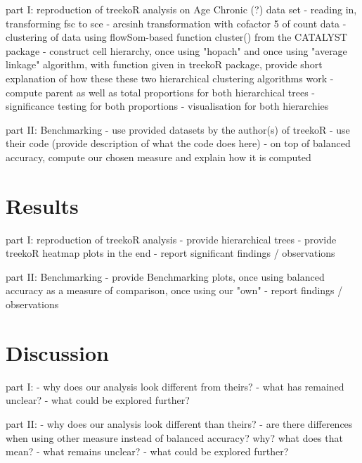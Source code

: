 \documentclass[11pt,a4paper,twoside]{report}\usepackage[]{graphicx}\usepackage[]{color}
\begin{document}
part I: reproduction of treekoR analysis on Age Chronic (?) data set
- reading in, transforming fsc to sce
- arcsinh transformation with cofactor 5 of count data
- clustering of data using flowSom-based function cluster() from the CATALYST package
- construct cell hierarchy, once using "hopach" and once using "average linkage" algorithm, with function given in treekoR package, provide short explanation of how these these two hierarchical clustering algorithms work
- compute parent as well as total proportions for both hierarchical trees
- significance testing for both proportions
- visualisation for both hierarchies


part II: Benchmarking
- use provided datasets by the author(s) of treekoR
- use their code (provide description of what the code does here)
- on top of balanced accuracy, compute our chosen measure and explain how it is computed




\chapter{Results}\label{sec:results}

part I: reproduction of treekoR analysis
- provide hierarchical trees
- provide treekoR heatmap plots in the end
- report significant findings / observations

part II: Benchmarking
- provide Benchmarking plots, once using balanced accuracy as a measure of comparison, once using our "own"
- report findings / observations




% 
\chapter{Discussion}\label{sec:discussion}

part I:
- why does our analysis look different from theirs?
- what has remained unclear?
- what could be explored further?

part II: 
- why does our analysis look different than theirs?
- are there differences when using other measure instead of balanced accuracy? why? what does that mean?
- what remains unclear?
- what could be explored further?
\end{document}
